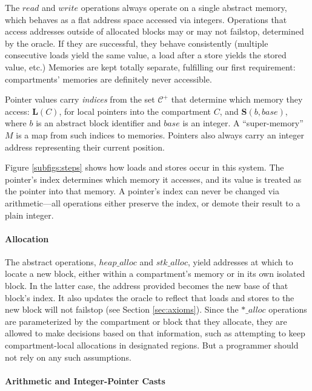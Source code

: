 \documentclass{article}
\begin{document}
The \(\mathit{read}\) and \(\mathit{write}\) operations always operate on a single
abstract memory, which behaves as a flat address space accessed via integers.
Operations that access addresses outside of allocated blocks
may or may not failstop, determined by the oracle. If they are successful, they
behave consistently (multiple consecutive loads yield the same value, a load after
a store yields the stored value, etc.) Memories are kept totally
separate, fulfilling our first requirement: compartments' memories are definitely
never accessible.

Pointer values carry {\it indices} from the set \(\mathcal{C}^+\) that determine
which memory they access: \(\mathbf{L}(C)\), for local pointers into the compartment
\(C\), and \(\mathbf{S}(b,\mathit{base})\), where \(b\) is an abstract block
identifier and \(\mathit{base}\) is an integer. A ``super-memory'' \(M\) is a map
from such indices to memories. Pointers also always carry an integer address
representing their current position.

Figure \ref{subfigs:steps} shows how loads and stores occur in this system.
The pointer's index determines which memory it accesses, and its value is treated
as the pointer into that memory. A pointer's index can never be changed via
arithmetic---all operations either preserve the index, or demote their result
to a plain integer.

\paragraph{Allocation}

The abstract operations, \(\mathit{heap\_alloc}\) and \(\mathit{stk\_alloc}\),
yield addresses at which to locate a new block, either within a compartment's memory
or in its own isolated block. In the latter case, the address provided becomes
the new base of that block's index. It also updates the oracle to reflect that loads
and stores to the new block will not failstop (see Section \ref{sec:axioms}). Since
the \(\mathit{*\_alloc}\) operations are parameterized by the compartment
or block that they allocate, they are allowed to make decisions based on that
information, such as attempting to keep compartment-local allocations in designated
regions. But a programmer should not rely on any such assumptions.

\paragraph{Arithmetic and Integer-Pointer Casts}
\end{document}
